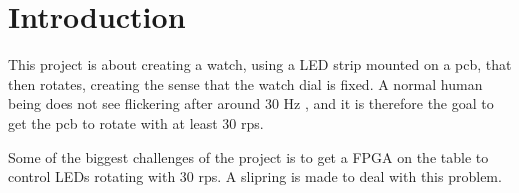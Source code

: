 \section{Introduction}
This project is about creating a watch, using a LED strip mounted on a pcb, that then rotates, creating the sense that the watch dial is fixed. 
A normal human being does not see flickering after around 30 Hz \cite{article:rpm}, and it is therefore the goal to get the pcb to rotate with at least 30 rps.

Some of the biggest challenges of the project is to get a FPGA on the table to control LEDs rotating with 30 rps.
A slipring is made to deal with this problem.
